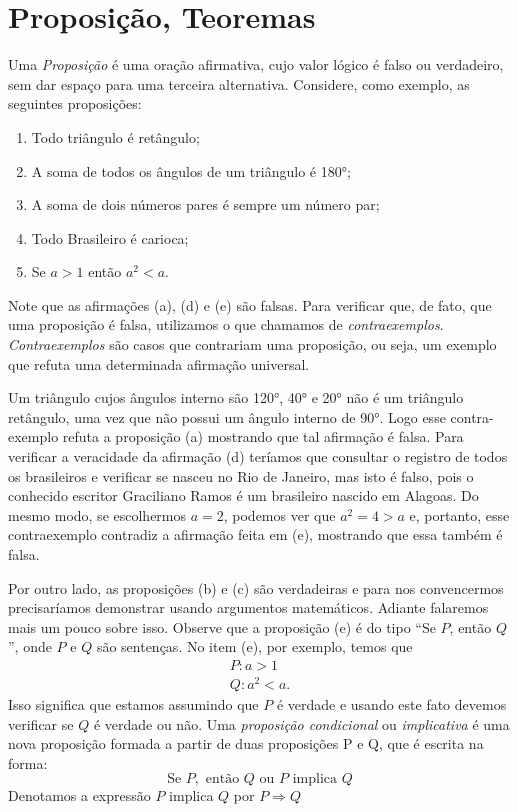 \section{Proposição, Teoremas}

Uma \emph{Proposição} é uma oração afirmativa, cujo valor lógico é falso ou
verdadeiro, sem dar espaço para uma terceira alternativa. Considere, como
exemplo, as seguintes proposições:
\begin{enumerate}[label=\alph*)]
    \item Todo triângulo é retângulo;
    \item A soma de todos os ângulos de um triângulo é \ang{180};
    \item A soma de dois números pares é sempre um número par;
    \item Todo Brasileiro é carioca;
    \item Se $a>1$ então $a^2<a$.
\end{enumerate}
Note que as afirmações (a), (d) e (e) são falsas. Para verificar que, de
fato, que uma proposição é falsa, utilizamos o que chamamos de
\emph{contraexemplos}. \emph{Contraexemplos} são casos que contrariam uma
proposição, ou seja, um exemplo que refuta uma determinada afirmação universal.

Um triângulo cujos ângulos interno são \ang{120}, \ang{40} e
\ang{20} não é um triângulo retângulo, uma vez que não possui um ângulo
interno de \ang{90}. Logo esse contra-exemplo refuta a proposição (a)
mostrando que tal afirmação é falsa. Para verificar a veracidade da afirmação
(d) teríamos que consultar o registro de todos os brasileiros e verificar se
nasceu no Rio de Janeiro, mas isto é falso, pois o conhecido escritor Graciliano
Ramos é um brasileiro nascido em Alagoas. Do mesmo modo, se escolhermos $a=2$,
podemos ver que $a^2=4 > a$ e, portanto, esse contraexemplo contradiz a
afirmação feita em (e), mostrando que essa também é falsa.

Por outro lado, as proposições (b) e (c) são verdadeiras e para nos
convencermos precisaríamos demonstrar usando argumentos matemáticos. Adiante
falaremos mais um pouco sobre isso. Observe que a proposição (e) é do tipo
``Se $P$, então $Q$'', onde $P$ e $Q$ são sentenças. No item (e), por exemplo,
temos que
\begin{gather*}
  P\colon a>1 \\
  Q\colon a^2<a.
\end{gather*}
Isso significa que estamos assumindo que $P$ é verdade e usando este fato
devemos verificar se $Q$ é verdade ou não. Uma \emph{proposição condicional}
ou \emph{implicativa} é uma nova proposição formada a partir de duas
proposições P e Q, que é escrita na forma:
\[
  \text{Se }       P,
  \text{ então }   Q
  \text{ ou }      P
  \text{ implica } Q
\]
Denotamos a expressão
$P$ implica $Q$ por $P \Rightarrow Q$

